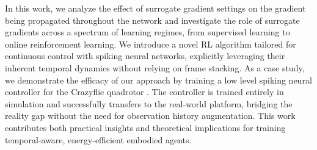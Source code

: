 In this work, we analyze the effect of surrogate gradient settings on the gradient being propagated throughout the network and investigate the role of surrogate gradients across a spectrum of learning regimes, from supervised learning to online reinforcement learning. We introduce a novel RL algorithm tailored for continuous control with spiking neural networks, explicitly leveraging their inherent temporal dynamics without relying on frame stacking. As a case study, we demonstrate the efficacy of our approach by training a low level spiking neural controller for the Crazyflie quadrotor \cite{crazyflie}. The controller is trained entirely in simulation and successfully transfers to the real-world platform, bridging the reality gap without the need for observation history augmentation. This work contributes both practical insights and theoretical implications for training temporal-aware, energy-efficient embodied agents. 



